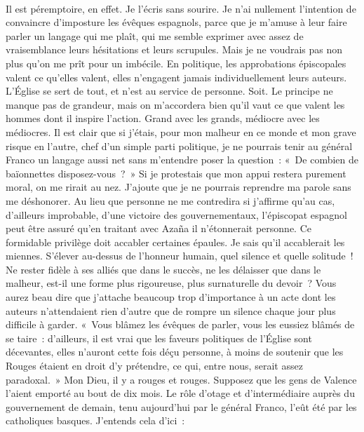 \documentclass[french,twoside]{book} %
\begin{document}
\noindent  \par
Il est péremptoire, en effet. Je l’écris sans sourire. Je n’ai nullement l’intention de convaincre d’imposture les évêques espagnols, parce que je m’amuse à leur faire parler un langage qui me plaît, qui me semble exprimer avec assez de vraisemblance leurs hésitations et leurs scrupules. Mais je ne voudrais pas non plus qu’on me prît pour un imbécile. En politique, les approbations épiscopales valent ce qu’elles valent, elles n’engagent jamais individuellement leurs auteurs. L’Église se sert de tout, et n’est au service de personne. Soit. Le principe ne manque pas de grandeur, mais on m’accordera bien qu’il vaut ce que valent les hommes dont il inspire l’action. Grand avec les grands, médiocre avec les médiocres. Il est clair que si j’étais, pour mon malheur en ce monde et mon grave risque en l’autre, chef d’un simple parti politique, je ne pourrais tenir au général Franco un langage aussi net sans m’entendre poser la question : « De combien de baïonnettes disposez-vous ? » Si je protestais que mon appui restera purement moral, on me rirait au nez. J’ajoute que je ne pourrais reprendre ma parole sans me déshonorer. Au lieu que personne ne me contredira si j’affirme qu’au cas, d’ailleurs improbable, d’une victoire des gouvernementaux, l’épiscopat espagnol peut être assuré qu’en traitant avec Azaña il n’étonnerait personne. Ce formidable privilège doit accabler certaines épaules. Je sais qu’il accablerait les miennes. S’élever au-dessus de l’honneur humain, quel silence et quelle solitude ! Ne rester fidèle à ses alliés que dans le succès, ne les délaisser que dans le malheur, est-il une forme plus rigoureuse, plus surnaturelle du devoir ? Vous aurez beau dire que j’attache beaucoup trop d’importance à un acte dont les auteurs n’attendaient rien d’autre que de rompre un silence chaque jour plus difficile à garder. « Vous blâmez les évêques de parler, vous les eussiez blâmés de se taire : d’ailleurs, il est vrai que les faveurs politiques de l’Église sont décevantes, elles n’auront cette fois déçu personne, à moins de soutenir que les Rouges étaient en droit d’y prétendre, ce qui, entre nous, serait assez paradoxal. » Mon Dieu, il y a rouges et rouges. Supposez que les gens de Valence l’aient emporté au bout de dix mois. Le rôle d’otage et d’intermédiaire auprès du gouvernement de demain, tenu aujourd’hui par le général Franco, l’eût été par les catholiques basques. J’entends cela d’ici :\par
\end{document}

